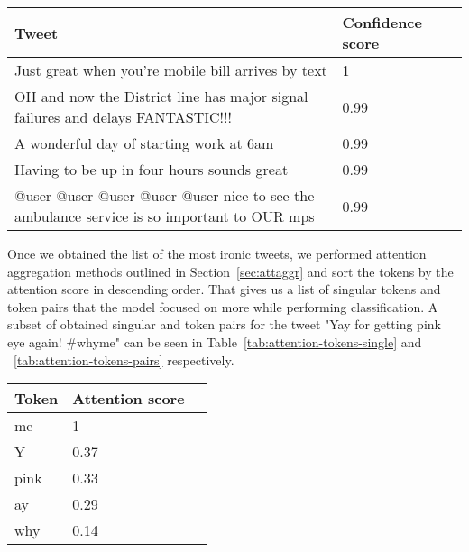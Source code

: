 \documentclass[10pt, a4paper]{article}
\begin{document}
\begin{table*}
\caption{Most Ironic Tweets in the Test Set}
\label{tab:most-ironic-test}
\begin{center}
\begin{tabular}{llr}
\toprule
Tweet & Confidence score\\
\midrule
Just great when you're mobile bill arrives by text                                          & 1 \\
OH and now the District line has major signal failures and delays FANTASTIC!!!              & 0.99 \\
A wonderful day of starting work at 6am                                                     & 0.99 \\
Having to be up in four hours sounds great                                                  & 0.99 \\
@user @user @user @user @user  nice to see the ambulance service is so important to OUR mps & 0.99 \\
\bottomrule
\end{tabular}
\end{center}
\end{table*}

Once we obtained the list of the most ironic tweets, we performed attention aggregation methods outlined in Section~\ref{sec:attaggr} and sort the tokens by the attention score in descending order.
That gives us a list of singular tokens and token pairs that the model focused on more while performing classification.
A subset of obtained singular and token pairs for the tweet "Yay for getting pink eye again!  \#whyme" can be seen in Table~\ref{tab:attention-tokens-single} and ~\ref{tab:attention-tokens-pairs} respectively.

\begin{table*}
\caption{Single Tokens With Highest Attention for the Tweet "Yay for getting pink eye again!  \#whyme"}
\label{tab:attention-tokens-single}
\begin{center}
\begin{tabular}{llr}
\toprule
Token & Attention score\\
\midrule
me    & 1 \\
Y     & 0.37 \\
pink  & 0.33 \\
ay    & 0.29 \\
why   & 0.14 \\
\bottomrule
\end{tabular}
\end{center}
\end{table*}
\end{document}
